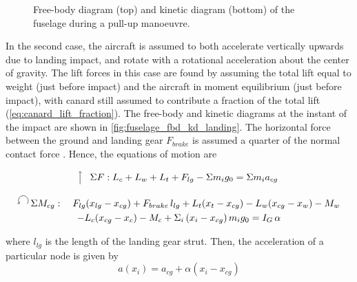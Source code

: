 \begin{figure}[H]
    \caption{Free-body diagram (top) and kinetic diagram (bottom) of the fuselage during a pull-up manoeuvre.}
    \label{fig:fuselage_fbd_kd_flight}
\end{figure}


In the second case, the aircraft is assumed to both accelerate vertically upwards due to landing impact, and rotate with a rotational acceleration about the center of gravity. The lift forces in this case are found by assuming the total lift equal to weight (just before impact) and the aircraft in moment equilibrium (just before impact), with canard still assumed to contribute a fraction of the total lift (\autoref{eq:canard_lift_fraction}). The free-body and kinetic diagrams at the instant of the impact are shown in \autoref{fig:fuselage_fbd_kd_landing}. The horizontal force between the ground and landing gear $F_{brake}$ is assumed a quarter of the normal contact force \cite{niu1999airframe}. Hence, the equations of motion are

\begin{equation}
     \tikz[baseline=-0.6ex]{\draw[->] (0,-0.25) -- (0,0.25);}
    \quad \Sigma F: L_c+L_w+L_t+F_{lg}-\Sigma m_i g_0=\Sigma m_i a_{cg}
\end{equation}

\begin{multline}
    \tikz[baseline=-0.6ex]{\draw[->] (0,0) arc (-40:220:0.18)} \, \Sigma M_{cg}: \quad
    F_{lg}(x_{lg}-x_{cg}) + F_{brake}\,l_{lg} + L_t(x_t-x_{cg}) - L_w(x_{cg}-x_w) - M_w \\
    - L_c(x_{cg}-x_c) - M_c + \Sigma_i\,(x_i-x_{cg})\,m_i g_0 = I_G\,\alpha
\end{multline}

where $l_{lg}$ is the length of the landing gear strut. Then, the acceleration of a particular node is given by 
\begin{equation}
    a(x_i)=a_{cg}+\alpha (x_i-x_{cg})
\end{equation}


